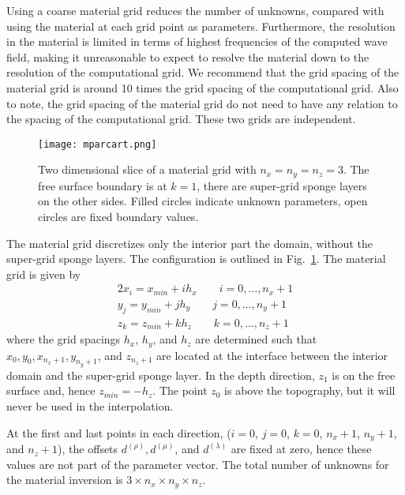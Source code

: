 \documentclass[12pt]{report}
\begin{document}
\par
Using a coarse material grid reduces the number of unknowns, compared with using the 
material at each grid point as parameters. Furthermore, the resolution in the material
is limited in terms of highest frequencies of the computed wave field, making it unreasonable
to expect to resolve the material down to the resolution of the computational grid.
We recommend that the grid spacing of the material grid is around 10 times 
the grid spacing of the computational grid. Also to note, the grid spacing of the material 
grid do not need to have any relation to the spacing of the computational grid. 
These two grids are independent.
\par
\begin{figure}
\begin{center}
\texttt{[image: mparcart.png]}
\caption{Two dimensional slice of a material grid with $n_x=n_y=n_z=3$. The free surface boundary
is at $k=1$, there are super-grid sponge layers on the other sides. Filled circles indicate unknown
parameters, open circles are fixed boundary values.}
\label{fig:mparcart}
\end{center}
\end{figure}
\par
The material grid discretizes only the interior part the domain, without the super-grid
sponge layers. The configuration is outlined in Fig.~\ref{fig:mparcart}.
The material grid is given by
\begin{alignat}{2}
 x_i = x_{min}+ i h_x \qquad i=0,\ldots,n_x+1\\
 y_j = y_{min}+ j h_y \qquad j=0,\ldots,n_y+1\\
 z_k = z_{min}+ k h_z \qquad k=0,\ldots,n_z+1
\end{alignat}
where the grid spacings $h_x$, $h_y$, and $h_z$ are determined such that $x_0, y_0, x_{n_x+1}, y_{n_y+1}$,
and $z_{n_z+1}$ are located at the interface between the interior domain and the super-grid sponge layer. 
In the depth direction, $z_1$ is on the free surface and, hence $z_{min}=-h_z$. The point $z_0$ is above the 
topography, but it will never be used in the interpolation. 

At the first and last points in each direction, ($i=0$, $j=0$, $k=0$, $n_x+1$, $n_y+1$, and $n_z+1$),
the offsets $d^{(\rho)}, d^{(\mu)}$, and $d^{(\lambda)}$ are fixed at zero, hence these values are
not part of the parameter vector. The total number of unknowns for the material inversion
is $3 \times n_x \times n_y \times n_z$.
\end{document}
